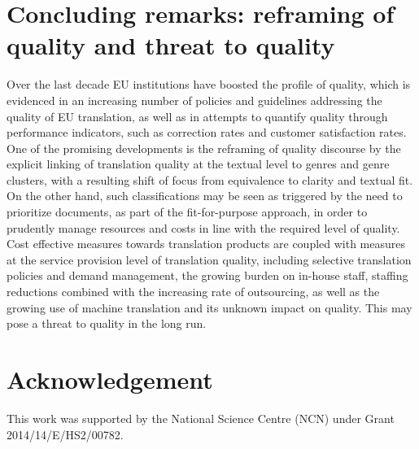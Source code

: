 \documentclass[output=paper]{langsci/langscibook}
\begin{document}
\section{Concluding remarks: reframing of quality and threat to quality}\label{sec:biel:4}

Over the last decade EU institutions have boosted the profile of quality, which is evidenced in an increasing number of policies and guidelines addressing the quality of EU translation, as well as in attempts to quantify quality through performance indicators, such as correction rates and customer satisfaction rates. One of the promising developments is the reframing of quality discourse by the explicit linking of translation quality at the textual level to genres and genre clusters, with a resulting shift of focus from equivalence to clarity and textual fit. On the other hand, such classifications may be seen as triggered by the need to prioritize documents, as part of the fit-for-purpose approach, in order to prudently manage resources and costs in line with the required level of quality. Cost effective measures towards translation products are coupled with measures at the service provision level of translation quality, including selective translation policies and demand management, the growing burden on in-house staff, staffing reductions combined with the increasing rate of outsourcing, as well as the growing use of machine translation and its unknown impact on quality. This may pose a threat to quality in the long run.

 
\section*{Acknowledgement}
This work was supported by the National Science Centre (NCN) under Grant 2014/14/E/HS2/00782.

\sloppy
\printbibliography[heading=subbibliography,notkeyword=this] 
\end{document}
